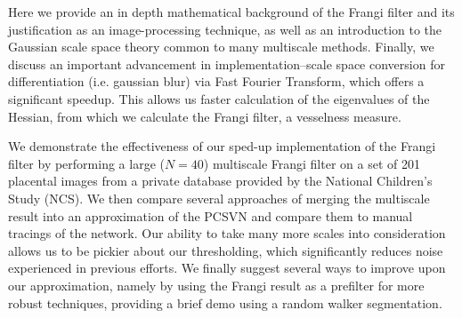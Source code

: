 Here we provide an in depth mathematical background of the Frangi filter and its justification as an image-processing technique, as well as an introduction to the Gaussian scale space theory common to many multiscale methods. Finally, we discuss an important advancement in implementation--scale space conversion for differentiation (i.e. gaussian blur) via Fast Fourier Transform, which offers a significant speedup. This allows us faster calculation of the eigenvalues of the Hessian, from which we calculate the Frangi filter, a vesselness measure.

We demonstrate the effectiveness of our sped-up implementation of the Frangi filter by performing a large ($N=40$) multiscale Frangi filter on a set of 201 placental images from a private database provided by the National Children's Study (NCS). We then compare several approaches of merging the multiscale result into an approximation of the PCSVN and compare them to manual tracings of the network. Our ability to take many more scales into consideration allows us to be pickier about our thresholding, which significantly reduces noise experienced in previous efforts. We finally suggest several ways to improve upon our approximation, namely by using the Frangi result as a prefilter for more robust techniques, providing a brief demo using a random walker segmentation.